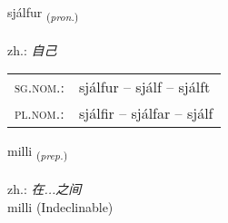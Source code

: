\documentclass[frontgrid, backgrid]{flacards}\usepackage[]{graphicx}\usepackage[]{xcolor}
\begin{document}
\renewcommand{\blhead}{\vskip5pt {\small\bfseries\footnotesize Fornafn | 代词 }}
\renewcommand{\bcfoot}{\vskip5pt \hspace{2pt}{\small\bfseries\footnotesize 1K}}


{sjálfur \small{\textsubscript{(\textit{pron.})}} \\[1ex] %
\textphonetic{[sjaulvʏr]} \\
zh.: \emph{自己} \\  [2ex]
\renewcommand*{\arraystretch}{0.8}
\begin{tabular}{ll}
\textsc{sg.nom.}: & sjálfur  --  sjálf -- sjálft \\ 
\textsc{pl.nom.}: & sjálfir -- sjálfar -- sjálf
\end{tabular}
}


\renewcommand{\flhead}{\vskip5pt \fboxsep=0pt {\small\bfseries\footnotesize Forsetning | 介词}}
\renewcommand{\fcfoot}{\vskip5pt \fboxsep=0pt \hspace{2pt}{\small\bfseries\footnotesize 1K}}

\renewcommand{\blhead}{\vskip5pt {\small\bfseries\footnotesize Forsetning | 介词 }}
\renewcommand{\bcfoot}{\vskip5pt \hspace{2pt}{\small\bfseries\footnotesize 1K}}


{milli \small{\textsubscript{(\textit{prep.})}} \\[1ex]
\textphonetic{[mɪtlɪ]} \\
zh.: \emph{在...之间} \\  [2ex]
milli (Indeclinable)}


\renewcommand{\flhead}{\vskip5pt \fboxsep=0pt {\small\bfseries\footnotesize Forsetning | 介词}}
\renewcommand{\fcfoot}{\vskip5pt \fboxsep=0pt \hspace{2pt}{\small\bfseries\footnotesize 1K}}

\renewcommand{\blhead}{\vskip5pt {\small\bfseries\footnotesize Forsetning | 介词 }}
\renewcommand{\bcfoot}{\vskip5pt \hspace{2pt}{\small\bfseries\footnotesize 1K}}
\end{document}
